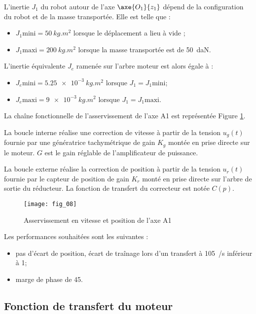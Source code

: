 L’inertie $J_1$ du robot autour de l’axe $\axe{O_1}{z_1}$ dépend de la configuration du robot et de la masse
transportée. Elle est telle que : 
\begin{itemize}
\item $J_1 \text{mini} = \SI{50}{kg.m^2}$  lorsque le déplacement a lieu à vide ; 
\item $J_1 \text{maxi} = \SI{200}{kg.m^2}$  lorsque la masse transportée est de \SI{50}{daN}. 
\end{itemize}
L’inertie équivalente $J_e$ ramenée sur l’arbre moteur est alors égale à : 
\begin{itemize}
\item $J_e \text{mini} = \SI{5,25e-3}{kg.m^2}$  lorsque $J_1 = J_1 \text{mini}$; 
\item $J_e \text{maxi} = \SI{9e-3}{kg.m^2}$  lorsque $J_1 = J_1 \text{maxi}$. 
\end{itemize}

La chaîne fonctionnelle de l’asservissement de l’axe A1 est représentée Figure \ref{kuka:fig:08}. 

La boucle interne réalise une correction de vitesse à partir de la tension $u_g(t)$ fournie par une 
génératrice tachymétrique de gain $K_g$ montée en prise directe sur le moteur. $G$ est le gain 
réglable de l’amplificateur de puissance. 

La boucle externe réalise la correction de position à partir de la tension $u_r(t)$ fournie par le 
capteur de position de gain $K_r$ monté en prise directe sur l’arbre de sortie du réducteur. La 
fonction de transfert du correcteur est notée $C(p)$.

\begin{figure}[!h]
\centering
\texttt{[image: fig\_08]}
\caption{Asservissement en vitesse et position de l’axe A1\label{kuka:fig:08}}
\end{figure}

Les performances souhaitées sont les suivantes : 
\begin{itemize}
\item pas d’écart de position, écart de traînage lors d’un transfert à \SI{105}{\degres/s} inférieur à 1\degres ; 
\item marge de phase de 45\degres.
\end{itemize}
\fi

\subsection{Fonction de transfert du moteur}

